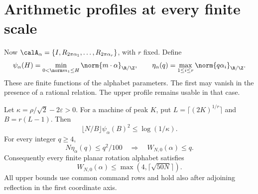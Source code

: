 \section{Arithmetic profiles at every finite scale}\label{sec:arithmetic}
Now $\calA_\alpha=\{I,R_{2\pi\alpha_1},\ldots,R_{2\pi\alpha_r}\}$, with $r$ fixed. Define
\begin{equation}\label{eq:psi-eta}
 \psi_\alpha(H)=\min_{0<\norm m_1\le H}\norm{m\cdot\alpha}_{\R/\Z},
 \qquad
 \eta_\alpha(q)=\max_{1\le i\le r}\norm{q\alpha_i}_{\R/\Z}.
\end{equation}
These are finite functions of the alphabet parameters. The first may vanish in the presence of a rational relation. The upper profile remains usable in that case.

\begin{theorem}\label{thm:arithmetic}
Let $\kappa=\rho/\sqrt2-2\varepsilon>0$. For a machine of peak $K$, put
$L=\lceil(2K)^{1/r}\rceil$ and $B=r(L-1)$. Then
\begin{equation}\label{eq:psi-lower}
 \lfloor N/B\rfloor\psi_\alpha(B)^2\le\log(1/\kappa).
\end{equation}
For every integer $q\ge4$,
\begin{equation}\label{eq:eta-upper}
 N\eta_\alpha(q)\le q^2/100
       \quad\Longrightarrow\quad W_{N,0}(\alpha)\le q.
\end{equation}
Consequently every finite planar rotation alphabet satisfies
\begin{equation}\label{eq:sqrt-upper}
                     W_{N,0}(\alpha)\le\max(4,\lceil\sqrt{50N}\rceil).
\end{equation}
All upper bounds use common command rows and hold also after adjoining reflection in the first coordinate axis.
\end{theorem}
